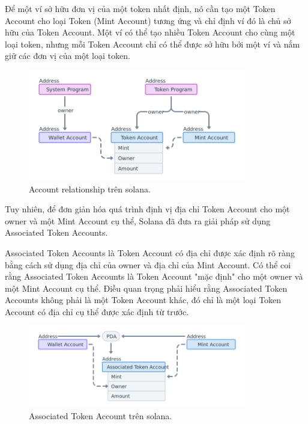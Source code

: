 \hspace{-1cm}Để một ví sở hữu đơn vị của một token nhất định, nó cần tạo một
Token Account cho loại Token (Mint Account) tương ứng và chỉ định ví đó là chủ
sở hữu của Token Account. Một ví có thể tạo nhiều Token Account cho cùng một
loại token, nhưng mỗi Token Account chỉ có thể được sở hữu bởi một ví và nắm
giữ các đơn vị của một loại token.

\begin{figure}[h!]
    \begin{center}

        \includegraphics[width=0.85\textwidth]{figures/c1/token-account-relationship.png}
        \caption{Account relationship trên solana.~\cite{SPL}}
        \label{fig:feature_interaction_example}
    \end{center}
\end{figure}
\hspace{-1cm}Tuy nhiên, để đơn giản hóa quá trình định vị địa chỉ Token Account
cho một owner và một Mint Account cụ thể, Solana đã đưa ra giải pháp sử dụng
Associated Token Accounts.

\hspace{-1cm}Associated Token Accounts là Token Account có địa chỉ được xác
định rõ ràng bằng cách sử dụng địa chỉ của owner và địa chỉ của Mint Account.
Có thể coi rằng Associated Token Accounts là Token Account "mặc định" cho một
owner và một Mint Account cụ thể. Điều quan trọng phải hiểu rằng Associated
Token Accounts không phải là một Token Account khác, đó chỉ là một loại Token
Account có địa chỉ cụ thể được xác định từ trước.

\begin{figure}[h!]
    \begin{center}

        \includegraphics[width=0.85\textwidth]{figures/c1/associated-token-account.png}
        \caption{Associated Token Account trên solana.~\cite{SPL}}
        \label{fig:feature_interaction_example}
    \end{center}
\end{figure}

